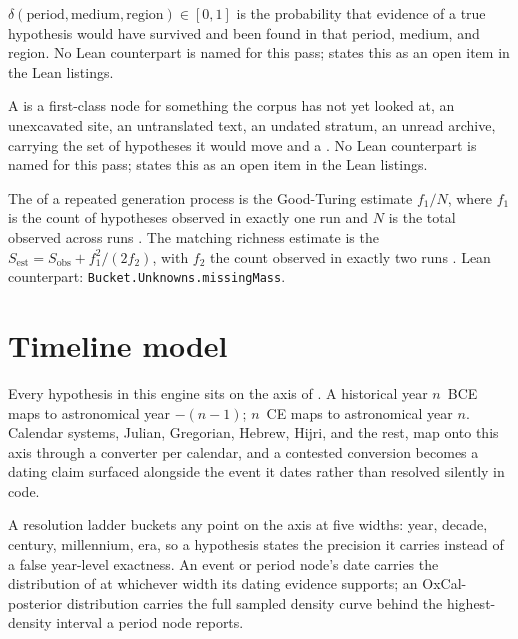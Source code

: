\documentclass[11pt]{article}
\begin{document}
\begin{definition}[Detectability]
\label{def:detect}
 $\delta(\mathrm{period},
\mathrm{medium}, \mathrm{region}) \in [0,1]$ is the probability that
evidence of a true hypothesis would have survived and been found in that
period, medium, and region. No Lean counterpart is named for this pass;
 states this as an open item in the Lean listings.
\end{definition}

\begin{definition}
\label{def:gap}
A  is a first-class node for something the
corpus has not yet looked at, an unexcavated site, an untranslated text,
an undated stratum, an unread archive, carrying the set of hypotheses it
would move and a . No Lean
counterpart is named for this pass;  states this as
an open item in the Lean listings.
\end{definition}

\begin{definition}
\label{def:missingmass}
The  of a repeated generation process is
the Good-Turing estimate $f_1/N$, where $f_1$ is the count of
hypotheses observed in exactly one run and $N$ is the total observed
across runs \autocite{good1953population}. The matching richness
estimate is the 
$S_{\mathrm{est}} = S_{\mathrm{obs}} + f_1^2/(2f_2)$, with $f_2$ the
count observed in exactly two runs \autocite{colwell1994estimating,
chao1987estimating}. Lean counterpart:
\texttt{Bucket.Unknowns.missingMass}.
\end{definition}

\section{Timeline model}
\label{sec:timeline}

Every hypothesis in this engine sits on the axis of .
A historical year $n$~BCE maps to astronomical year $-(n-1)$; $n$~CE maps
to astronomical year $n$. Calendar systems, Julian, Gregorian, Hebrew,
Hijri, and the rest, map onto this axis through a converter per calendar,
and a contested conversion becomes a dating claim surfaced alongside the
event it dates rather than resolved silently in code.

A resolution ladder buckets any point on the axis at five widths: year,
decade, century, millennium, era, so a hypothesis states the precision it
carries instead of a false year-level exactness. An event or
period node's date carries the 
distribution of  at whichever width its dating
evidence supports; an OxCal-posterior distribution carries the full
sampled density curve behind the highest-density interval a period node
reports.
\end{document}
